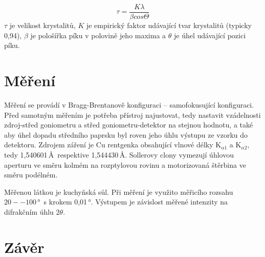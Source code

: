 \documentclass[a4paper,12pt]{article}
\begin{document}
\begin{equation}
	\tau = \dfrac{K\lambda}{\beta cos\Theta}
\end{equation}
$\tau$ je velikost krystalitů, $K$ je empirický faktor udávající tvar 
krystalitů (typicky 0,94), $\beta$ je pološířka píku v polovině jeho maxima a 
$\theta$ je úhel udávající pozici píku.

\section{Měření}
\par Měření se provádí v Bragg-Brentanově konfiguraci -- samofokusující 
konfiguraci. Před samotným měřením je potřeba přístroj najustovat, tedy 
nastavit 
vzádelnosti zdroj-střed goniometru a střed goniometru-detektor na stejnou 
hodnotu, a také aby úhel dopadu středního paprsku byl roven jeho úhlu výstupu 
ze vzorku do detektoru. Zdrojem záření je Cu rentgenka obsahující vlnové délky 
K$_{\alpha1}$ a K$_{\alpha2}$, tedy 1,540601\,\AA\ respektive 1,544430\,\AA. 
Sollerovy clony vymezují úhlovou aperturu ve směru kolmém na rozptylovou rovinu 
a motorizovaná štěrbina ve směru podélném.
\par Měřenou látkou je kuchyňská sůl. Při měření je využito měřicího rozsahu 
$20 -- 100$\,°~s krokem 0,01\,°. Výstupem je závislost měřené intenzity na 
difrakčním úhlu $2\theta$.




	
	\clearpage
	\section{Závěr}

	
	
\end{document}
